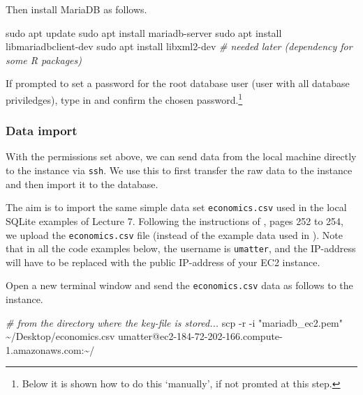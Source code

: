 \documentclass[
  12pt,
]{style/krantz}
\newenvironment{Shaded}{\begin{snugshade}}{\end{snugshade}}
\newcommand{\AttributeTok}[1]{\textcolor[rgb]{0.77,0.63,0.00}{#1}}
\newcommand{\CommentTok}[1]{\textcolor[rgb]{0.56,0.35,0.01}{\textit{#1}}}
\newcommand{\FunctionTok}[1]{\textcolor[rgb]{0.00,0.00,0.00}{#1}}
\newcommand{\NormalTok}[1]{#1}
\newcommand{\StringTok}[1]{\textcolor[rgb]{0.31,0.60,0.02}{#1}}
\begin{document}
Then install MariaDB as follows.

\begin{Shaded}
\begin{Highlighting}[]
\FunctionTok{sudo}\NormalTok{ apt update}
\FunctionTok{sudo}\NormalTok{ apt install mariadb{-}server}
\FunctionTok{sudo}\NormalTok{ apt install libmariadbclient{-}dev}
\FunctionTok{sudo}\NormalTok{ apt install libxml2{-}dev }\CommentTok{\# needed later (dependency for some R packages)}
\end{Highlighting}
\end{Shaded}

If prompted to set a password for the root database user (user with all database priviledges), type in and confirm the chosen password.\footnote{Below it is shown how to do this `manually', if not promted at this step.}

\hypertarget{data-import-3}{%
\subsubsection{Data import}\label{data-import-3}}

With the permissions set above, we can send data from the local machine directly to the instance via \texttt{ssh}. We use this to first transfer the raw data to the instance and then import it to the database.

The aim is to import the same simple data set \texttt{economics.csv} used in the local SQLite examples of Lecture 7. Following the instructions of \citet{walkowiak_2016}, pages 252 to 254, we upload the \texttt{economics.csv} file (instead of the example data used in \citet{walkowiak_2016}). Note that in all the code examples below, the username is \texttt{umatter}, and the IP-address will have to be replaced with the public IP-address of your EC2 instance.

Open a new terminal window and send the \texttt{economics.csv} data as follows to the instance.

\begin{Shaded}
\begin{Highlighting}[]
\CommentTok{\# from the directory where the key{-}file is stored...}
\FunctionTok{scp} \AttributeTok{{-}r} \AttributeTok{{-}i} \StringTok{"mariadb\_ec2.pem"}\NormalTok{ \textasciitilde{}/Desktop/economics.csv umatter@ec2{-}184{-}72{-}202{-}166.compute{-}1.amazonaws.com:\textasciitilde{}/}
\end{Highlighting}
\end{Shaded}
\end{document}
